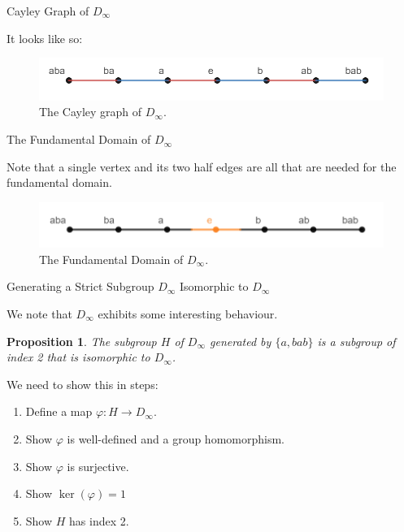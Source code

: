 \documentclass[usenames,dvipsnames]{beamer}
\newtheorem{proposition}{Proposition}
\begin{document}
\begin{frame}{Cayley Graph of $D_\infty$}

It looks like so:

\begin{figure}[h]
    \centering
    \includegraphics[width=1\textwidth]{images/2-01-Cayley_Graph.png}
    \caption{The Cayley graph of $D_\infty$.}
\end{figure}

\end{frame}

\begin{frame}{The Fundamental Domain of $D_\infty$}

Note that a single vertex and its two half edges are all that are needed for the fundamental domain.
\begin{figure}[h]
    \centering
    \includegraphics[width=1\textwidth]{images/2-01-01-Fundamental_Domain.png}
    \caption{The Fundamental Domain of $D_\infty$.}
\end{figure}

\end{frame}

\begin{frame}{Generating a Strict Subgroup $D_\infty$ Isomorphic to $D_\infty$}

We note that $D_\infty$ exhibits some interesting behaviour.

\begin{proposition}

The subgroup $H$ of $D_\infty$ generated by $\{a,bab\}$ is a subgroup of index 2 that is isomorphic to
$D_\infty$.

\end{proposition}

We need to show this in steps:

\begin{enumerate}
  \item Define a map $\varphi:H\rightarrow D_{\infty}$.
  \item Show $\varphi$ is well-defined and a group homomorphism.
  \item Show $\varphi$ is surjective.
  \item Show $\ker(\varphi)={1}$
  \item Show $H$ has index 2.
\end{enumerate}

\end{frame}
\end{document}
